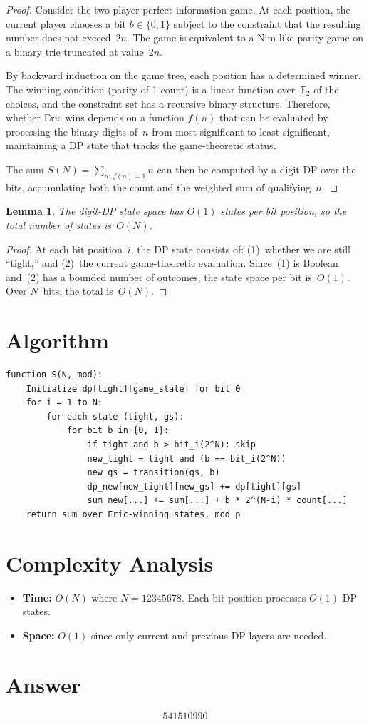 \documentclass[11pt]{article}
\newtheorem{lemma}[theorem]{Lemma}
\begin{document}
\begin{proof}
Consider the two-player perfect-information game. At each position, the current player chooses a bit $b \in \{0,1\}$ subject to the constraint that the resulting number does not exceed~$2n$. The game is equivalent to a Nim-like parity game on a binary trie truncated at value~$2n$.

By backward induction on the game tree, each position has a determined winner. The winning condition (parity of 1-count) is a linear function over~$\mathbb{F}_2$ of the choices, and the constraint set has a recursive binary structure. Therefore, whether Eric wins depends on a function $f(n)$ that can be evaluated by processing the binary digits of~$n$ from most significant to least significant, maintaining a DP state that tracks the game-theoretic status.

The sum $S(N) = \sum_{n:\, f(n)=1} n$ can then be computed by a digit-DP over the bits, accumulating both the count and the weighted sum of qualifying~$n$.
\end{proof}

\begin{lemma}
The digit-DP state space has $O(1)$ states per bit position, so the total number of states is~$O(N)$.
\end{lemma}

\begin{proof}
At each bit position~$i$, the DP state consists of: (1)~whether we are still ``tight,'' and (2)~the current game-theoretic evaluation. Since~(1) is Boolean and~(2) has a bounded number of outcomes, the state space per bit is~$O(1)$. Over $N$~bits, the total is~$O(N)$.
\end{proof}

\section{Algorithm}

\begin{verbatim}
function S(N, mod):
    Initialize dp[tight][game_state] for bit 0
    for i = 1 to N:
        for each state (tight, gs):
            for bit b in {0, 1}:
                if tight and b > bit_i(2^N): skip
                new_tight = tight and (b == bit_i(2^N))
                new_gs = transition(gs, b)
                dp_new[new_tight][new_gs] += dp[tight][gs]
                sum_new[...] += sum[...] + b * 2^(N-i) * count[...]
    return sum over Eric-winning states, mod p
\end{verbatim}

\section{Complexity Analysis}

\begin{itemize}
    \item \textbf{Time:} $O(N)$ where $N = 12345678$. Each bit position processes $O(1)$ DP states.
    \item \textbf{Space:} $O(1)$ since only current and previous DP layers are needed.
\end{itemize}

\section{Answer}

\[
\boxed{541510990}
\]
\end{document}
